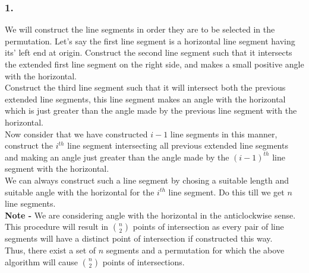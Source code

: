 \documentclass[a4paper]{article}
\begin{document}
\subsubsection*{1.}
We will construct the line segments in order they are to be selected in the permutation. Let's say the first line segment is a horizontal line segment having its' left end at origin. Construct the second line segment such that it intersects the extended first line segment on the right side, and makes a small positive angle with the horizontal. \\
Construct the third line segment such that it will intersect both the previous extended line segments, this line segment makes an angle with the horizontal which is just greater than the angle made by the previous line segment with the horizontal.\\
Now consider that we have constructed $i-1$ line segments in this manner, construct the $i^{th}$ line segment intersecting all previous extended line segments and making an angle just greater than the angle made by the ${(i-1)}^{th}$ line segment with the horizontal. \\
We can always construct such a line segment by chosing a suitable length and suitable angle with the horizontal for the $i^{th}$ line segment. Do this till we get $n$ line segments.\\
\textbf{Note - }We are considering angle with the horizontal in the anticlockwise sense.\\
This procedure will result in $n\choose2$ points of intersection as every pair of line segments will have a distinct point of intersection if constructed this way.\\
Thus, there exist a set of $n$ segments and a permutation for which the above algorithm will cause $n\choose2$ points of intersections.
\end{document}
